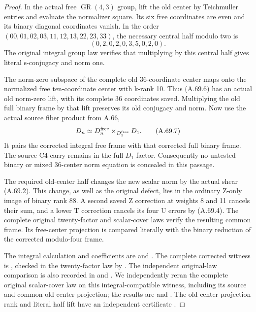 \begin{proof}
In the actual free \(\operatorname{GR}(4,3)\) group, lift the
old center by Teichmuller entries and evaluate the normalizer
square. Its six free coordinates are even and its binary diagonal
coordinates vanish. In the order
\((00,01,02,03,11,12,13,22,23,33)\), the necessary central
half modulo two is
\[
 (0,2,0,2,0,3,5,0,2,0).
 \tag{A.69.6}
\]
The original integral group law verifies that multiplying by this
central half gives literal s-conjugacy and norm one.

The norm-zero subspace of the complete old 36-coordinate center
maps onto the normalized free ten-coordinate center with k-rank
10. Thus (A.69.6) has an actual old norm-zero lift, with its
complete 36 coordinates saved. Multiplying the old full binary
frame by that lift preserves its old conjugacy and norm.
Now use the actual source fiber product from A.66,
\[
 D_n\simeq D_n^{\rm free}
             \mathbin{\times}_{D_1^{\rm free}}D_1.
 \tag{A.69.7}
\]
It pairs the corrected integral free frame with that corrected
full binary frame. The source C4 carry remains in the full
\(D_1\)-factor. Consequently no untested binary or mixed
36-center norm equation is concealed in this passage.

The required old-center half changes the new scalar norm by the
actual shear (A.69.2). This change, as well as the original defect,
lies in the ordinary Z-only image of binary rank 88. A second saved
Z correction at weights 8 and 11 cancels their sum, and a lower T
correction cancels its four U errors by (A.69.4). The complete
original twenty-factor and scalar-cover laws verify the resulting
common frame. Its free-center projection is compared literally
with the binary reduction of the corrected modulo-four frame.

The integral calculation and coefficients are
and .
The complete corrected witness is
,
checked in the twenty-factor law by
.
The independent original-law comparison is also recorded in
 and
.
We independently reran the complete original scalar-cover
law on this integral-compatible witness, including its source and
common old-center projection; the results are
 and
.
The old-center projection rank and literal half lift have an
independent certificate
.


\end{proof}

